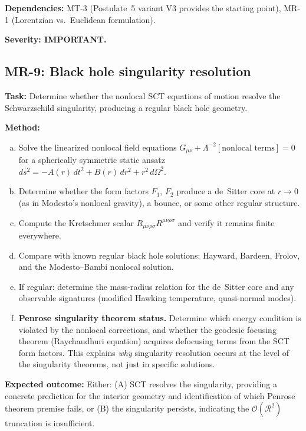 \documentclass[12pt,a4paper]{article}
\newcommand{\task}[1]{\noindent\textbf{Task:} #1\par}
\newcommand{\method}[1]{\noindent\textbf{Method:} #1\par}
\newcommand{\outcome}[1]{\noindent\textbf{Expected outcome:} #1\par}
\newcommand{\deps}[1]{\noindent\textbf{Dependencies:} #1\par}
\begin{document}
\deps{MT-3 (Postulate~5 variant V3 provides the starting point), MR-1
(Lorentzian vs.\ Euclidean formulation).}

\textbf{Severity: IMPORTANT.}

\subsection{MR-9: Black hole singularity resolution}
\label{task:MR9}

\task{Determine whether the nonlocal SCT equations of motion resolve
the Schwarzschild singularity, producing a regular black hole geometry.}

\method{
\begin{enumerate}[(a)]
  \item Solve the linearized nonlocal field equations
    $G_{\mu\nu} + \Lambda^{-2}[\text{nonlocal terms}] = 0$ for a
    spherically symmetric static ansatz $ds^2 = -A(r)\,dt^2 + B(r)\,dr^2
    + r^2\,d\Omega^2$.
  \item Determine whether the form factors $F_1$, $F_2$ produce a
    de~Sitter core at $r \to 0$ (as in Modesto's nonlocal gravity),
    a bounce, or some other regular structure.
  \item Compute the Kretschmer scalar $R_{\mu\nu\rho\sigma}R^{\mu\nu\rho\sigma}$
    and verify it remains finite everywhere.
  \item Compare with known regular black hole solutions: Hayward, Bardeen,
    Frolov, and the Modesto--Bambi nonlocal solution.
  \item If regular: determine the mass-radius relation for the de~Sitter
    core and any observable signatures (modified Hawking temperature,
    quasi-normal modes).
  \item \textbf{Penrose singularity theorem status.} Determine which
    energy condition is violated by the nonlocal corrections, and whether
    the geodesic focusing theorem (Raychaudhuri equation) acquires
    defocusing terms from the SCT form factors. This explains
    \emph{why} singularity resolution occurs at the level of the
    singularity theorems, not just in specific solutions.
\end{enumerate}
}

\outcome{Either: (A) SCT resolves the singularity, providing a concrete
prediction for the interior geometry and identification of which Penrose
theorem premise fails, or (B) the singularity persists,
indicating the $\mathcal{O}(\mathcal{R}^2)$ truncation is insufficient.}
\end{document}

